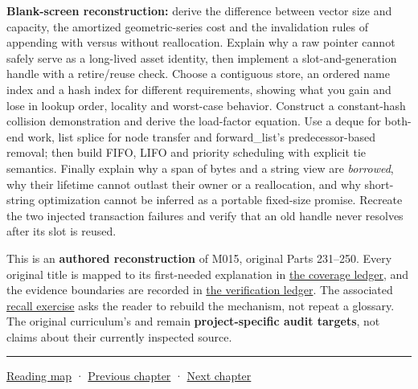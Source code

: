 \textbf{Blank-screen reconstruction:} derive the difference between vector size and capacity, the amortized geometric-series cost and the invalidation rules of appending with versus without reallocation. Explain why a raw pointer cannot safely serve as a long-lived asset identity, then implement a slot-and-generation handle with a retire/reuse check. Choose a contiguous store, an ordered name index and a hash index for different requirements, showing what you gain and lose in lookup order, locality and worst-case behavior. Construct a constant-hash collision demonstration and derive the load-factor equation. Use a deque for both-end work, list splice for node transfer and forward\_list's predecessor-based removal; then build FIFO, LIFO and priority scheduling with explicit tie semantics. Finally explain why a span of bytes and a string view are \emph{borrowed}, why their lifetime cannot outlast their owner or a reallocation, and why short-string optimization cannot be inferred as a portable fixed-size promise. Recreate the two injected transaction failures and verify that an old handle never resolves after its slot is reused.

This is an \textbf{authored reconstruction} of M015, original Parts 231--250. Every original title is mapped to its first-needed explanation in \hyperref[appendix-fd090d982a15-m015-parts-231250-growing-the-asset-registry-without-losing-identities]{the coverage ledger}, and the evidence boundaries are recorded in \hyperref[appendix-a103e7846d21-phase-5-additive-reconstruction-m015-parts-231250]{the verification ledger}. The associated \hyperref[appendix-960160274237-a-growing-asset-store-must-preserve-its-promises-m015-retrieval]{recall exercise} asks the reader to rebuild the mechanism, not repeat a glossary. The original curriculum's  and  remain \textbf{project-specific audit targets}, not claims about their currently inspected source.

\begin{center}\rule{0.5\linewidth}{0.5pt}\end{center}

\hyperref[volume-reading-map]{Reading map} · \hyperref[05-engine-i-ch004-resource-ownership-failure-paths-and-review-practice]{Previous chapter} · \hyperref[05-engine-i-ch006-queries-lazy-ranges-allocators-and-module-boundaries]{Next chapter}
